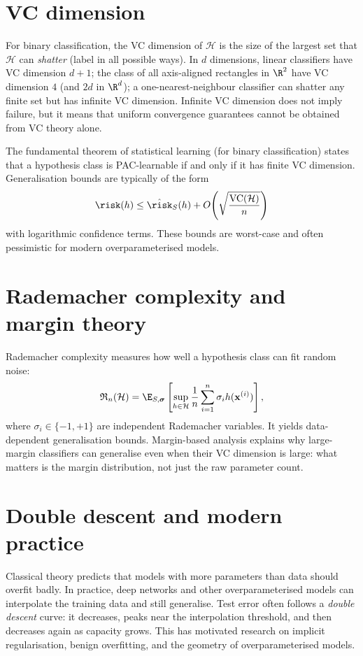 \documentclass[a4paper, 12pt]{book}
\begin{document}
\section{VC dimension}

For binary classification, the VC dimension of $\mathcal{H}$ is the size of the
largest set that $\mathcal{H}$ can \emph{shatter} (label in all possible ways). In
$d$ dimensions, linear classifiers have VC dimension $d+1$; the class of all
axis-aligned rectangles in $\R^2$ have VC dimension $4$ (and $2d$ in $\R^d$); a one-nearest-neighbour classifier can
shatter any finite set but has infinite VC dimension. Infinite VC dimension does not
imply failure, but it means that uniform convergence guarantees cannot be obtained
from VC theory alone.

The fundamental theorem of statistical learning (for binary classification) states
that a hypothesis class is PAC-learnable if and only if it has finite VC dimension.
Generalisation bounds are typically of the form
\begin{align}
    \risk(h) \leq \hat{\risk}_S(h)
    + O\!\left(\sqrt{\frac{\mathrm{VC}(\mathcal{H})}{n}}\right)
\end{align}
with logarithmic confidence terms. These bounds are worst-case and often pessimistic
for modern overparameterised models.

\section{Rademacher complexity and margin theory}

Rademacher complexity measures how well a hypothesis class can fit random noise:
\begin{align}
    \mathfrak{R}_n(\mathcal{H})
    = \E_{S,\boldsymbol{\sigma}}\left[
      \sup_{h\in\mathcal{H}}\frac{1}{n}\sum_{i=1}^n \sigma_i h(\mathbf{x}^{(i)})
    \right],
\end{align}
where $\sigma_i \in \{-1,+1\}$ are independent Rademacher variables. It yields
data-dependent generalisation bounds. Margin-based analysis explains why large-margin
classifiers can generalise even when their VC dimension is large: what matters is the
margin distribution, not just the raw parameter count.

\section{Double descent and modern practice}

Classical theory predicts that models with more parameters than data should overfit
badly. In practice, deep networks and other overparameterised models can interpolate
the training data and still generalise. Test error often follows a \emph{double
descent} curve: it decreases, peaks near the interpolation threshold, and then
decreases again as capacity grows. This has motivated research on implicit
regularisation, benign overfitting, and the geometry of overparameterised models.
\end{document}
